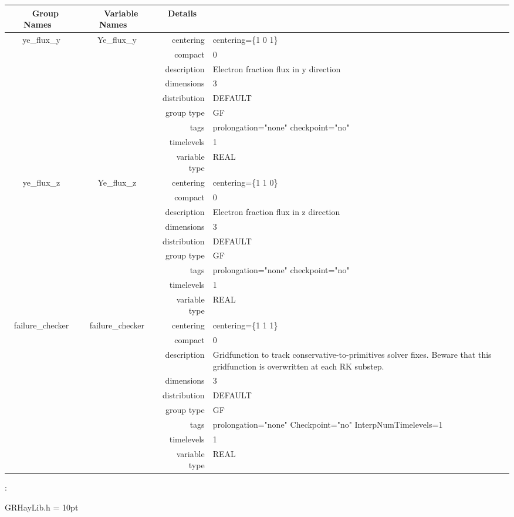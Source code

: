 \begin{tabular*}{150mm}{|c|c@{\extracolsep{\fill}}|rl|} \hline 
~ {\bf Group Names} ~ & ~ {\bf Variable Names} ~  &{\bf Details} ~ & ~ \\ 
\hline 
ye\_flux\_y & Ye\_flux\_y & centering & centering=\{1 0 1\} \\ 
 &  & compact & 0 \\ 
 &  & description & Electron fraction flux in y direction \\ 
 &  & dimensions & 3 \\ 
 &  & distribution & DEFAULT \\ 
 &  & group type & GF \\ 
 &  & tags & prolongation="none" checkpoint="no" \\ 
 &  & timelevels & 1 \\ 
 &  & variable type & REAL \\ 
\hline 
ye\_flux\_z & Ye\_flux\_z & centering & centering=\{1 1 0\} \\ 
 &  & compact & 0 \\ 
 &  & description & Electron fraction flux in z direction \\ 
 &  & dimensions & 3 \\ 
 &  & distribution & DEFAULT \\ 
 &  & group type & GF \\ 
 &  & tags & prolongation="none" checkpoint="no" \\ 
 &  & timelevels & 1 \\ 
 &  & variable type & REAL \\ 
\hline 
failure\_checker & failure\_checker & centering & centering=\{1 1 1\} \\ 
 &  & compact & 0 \\ 
 &  & description & Gridfunction to track conservative-to-primitives solver fixes. Beware that this gridfunction is overwritten at each RK substep. \\ 
 &  & dimensions & 3 \\ 
 &  & distribution & DEFAULT \\ 
 &  & group type & GF \\ 
 &  & tags & prolongation="none" Checkpoint="no" InterpNumTimelevels=1 \\ 
 &  & timelevels & 1 \\ 
 &  & variable type & REAL \\ 
\hline 
\end{tabular*} 



\vspace{5mm}

: 

GRHayLib.h
\vspace{2mm}\parskip = 10pt 
